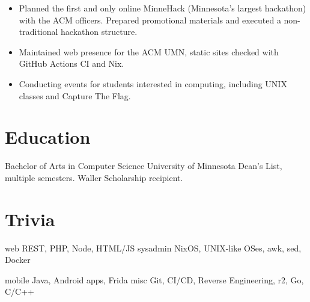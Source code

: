 \documentclass{moderncv}
\newcommand{\comment}[1]{}
\begin{document}
{
  \begin{itemize}[label=\rightarrow,noitemsep]
  \item Planned the first and only online MinneHack (Minnesota's largest hackathon) with the ACM officers. Prepared promotional materials and executed a non-traditional hackathon structure.
  \item Maintained web presence for the ACM UMN, static sites checked with GitHub Actions CI and Nix.
  \item Conducting events for students interested in computing, including UNIX classes and Capture The Flag.
  \end{itemize}
}

\comment{
\cventry{2019--2020}{Member, Controls Team}{UMN Solar Vehicle Project}{}{}
{
  \begin{itemize}[label=\rightarrow,noitemsep]
  \item Worked on design of the rearview system and integrated USB tethered logging for the telemetry system.
  \item Prototyped an editor for a YAML-based CAN packet definition schema in Rust.
  \item Participated extensively in build cycle (layups) for the Freya vehicle, which won 1st place at the Formula Sun Grand Prix.
  \end{itemize}
}}

\section{Education}
{Bachelor of Arts in Computer Science}
{University of Minnesota}
{}{}
{
  Dean's List, multiple semesters. Waller Scholarship recipient.
}


\section{Trivia}

\cvdoubleitem
{web}
{
  REST, PHP, Node, HTML/JS
}
{sysadmin}
{
  NixOS, UNIX-like OSes, awk, sed, Docker
}

\cvdoubleitem
{mobile}
{
  Java, Android apps, Frida
}
{misc}
{
  Git, CI/CD, Reverse Engineering, r2, Go, C/C++
}
\end{document}
